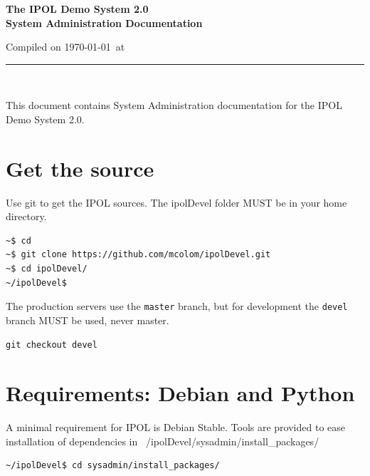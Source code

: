 \documentclass[a4paper,12pt]{article}
\begin{document}
\begin{titlepage}

\begin{center}
\vspace*{-1in}

\vspace*{0.6in}
\begin{Large}
\textbf{The IPOL Demo System 2.0 \\System Administration Documentation} \\
\end{Large}

\vspace*{0.6in}

\small{Compiled on \today\ at \currenttime}

\vspace*{0.6in}
\rule{80mm}{0.1mm}\\
\vspace*{0.1in}
\end{center}

\end{titlepage}

This document contains System Administration documentation for the IPOL Demo System 2.0.
\vspace*{0.6in}


\newpage

\tableofcontents
\newpage

\section{Get the source}
Use git to get the IPOL sources. The ipolDevel folder MUST be in your home directory.
\begin{verbatim}
~$ cd
~$ git clone https://github.com/mcolom/ipolDevel.git
~$ cd ipolDevel/
~/ipolDevel$
\end{verbatim}

The production servers use the {\tt master} branch, but for development the {\tt devel} branch MUST be used, never master.
\begin{verbatim}
git checkout devel
\end{verbatim}

\section{Requirements: Debian and Python}
A minimal requirement for IPOL is Debian Stable.
Tools are provided to ease installation of dependencies in ~/ipolDevel/sysadmin/install\_packages/
\begin{verbatim}
~/ipolDevel$ cd sysadmin/install_packages/
\end{verbatim}
\end{document}
